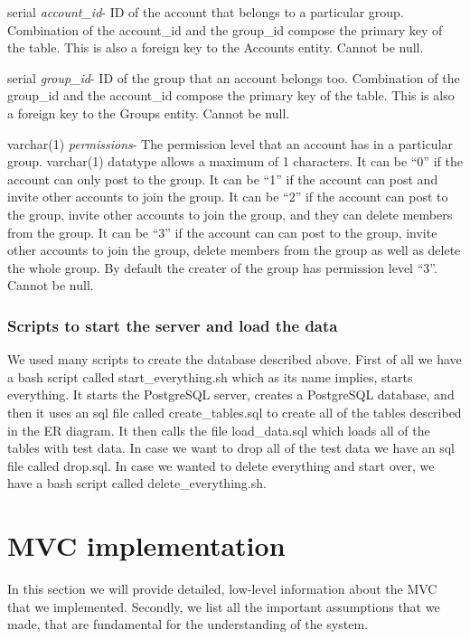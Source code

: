 \begin{description}
\item serial \textit{account\_id}-  ID of the account that belongs to a particular group.  Combination of the account\_id and the group\_id compose the primary key of the table.  This is also a foreign key to the Accounts entity.  Cannot be null.
\item serial \textit{group\_id}- ID of the group that an account belongs too.  Combination of the group\_id and the account\_id compose the primary key of the table.  This is also a foreign key to the Groups entity.  Cannot be null.
\item varchar(1) \textit{permissions}- The permission level that an account has in a particular group.  varchar(1) datatype allows a maximum of 1 characters.  It can be ``0'' if the account can only post to the group.  It can be ``1'' if the account can post and invite other accounts to join the group.  It can be ``2'' if the account can post to the group, invite other accounts to join the group, and they can delete members from the group.  It can be ``3'' if the account can can post to the group, invite other accounts to join the group, delete members from the group as well as delete the whole group.  By default the creater of the group has permission level ``3''.  Cannot be null.
\end{description}

\subsubsection{Scripts to start the server and load the data}
We used many scripts to create the database described above.  First of all we have a bash script called start\_everything.sh which as its name implies, starts everything.  It starts the PostgreSQL server, creates a PostgreSQL database, and then it uses an sql file called create\_tables.sql to create all of the tables described in the ER diagram.  It then calls the file load\_data.sql which loads all of the tables with test data.  In case we want to drop all of the test data we have an sql file called drop.sql.  In case we wanted to delete everything and start over, we have a bash script called delete\_everything.sh. 

\section{MVC implementation}
\label{sec:mvcimplement}
In this section we will provide detailed, low-level information about the MVC that we implemented. Secondly, we list all the important assumptions that we made, that are fundamental for the understanding of the system.

